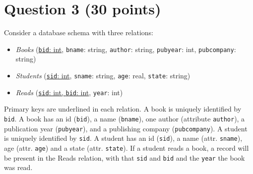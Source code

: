 \documentclass[letterpaper, 11pt]{article}
\begin{document}
\section*{Question 3 (30 points)}

Consider a database schema with three relations:
\begin{itemize}
    \item \textit{Books} (\ul{\texttt{bid}: int}, \texttt{bname}: string, \texttt{author}: string, \texttt{pubyear}: int, \texttt{pubcompany}: string)
    \item \textit{Students} (\ul{\texttt{sid}: int}, \texttt{sname}: string, \texttt{age}: real, \texttt{state}: string)
    \item \textit{Reads} (\ul{\texttt{sid}: int, \texttt{bid}: int}, \texttt{year}: int)
\end{itemize}

Primary keys are underlined  in each relation. A book is uniquely identified by \texttt{bid}. A book has an id (\texttt{bid}), a name (\texttt{bname}), one author (attribute \texttt{author}), a publication year (\texttt{pubyear}), and a publishing company (\texttt{pubcompany}). A student is uniquely identified by \texttt{sid}. A student has an id (\texttt{sid}), a name (attr. \texttt{sname}), age (attr. \texttt{age}) and a state (attr. \texttt{state}). If a student reads a book, a record will be present in the Reads relation, with that \texttt{sid} and \texttt{bid} and the \texttt{year} the book was read.
\end{document}
